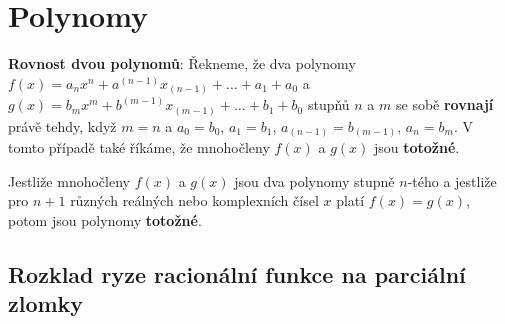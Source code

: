  \section{Polynomy}
      \begin{definition}\label{def_rov_poly}\textbf{Rovnost dvou polynomů}:
        Řekneme, že dva polynomy \(f(x)=a_nx^n+a^{(n-1)}x_{(n-1)}+\ldots+a_1+a_0\) a
        \(g(x)=b_mx^m+b^{(m-1)}x_{(m-1)}+\ldots+b_1+b_0\) stupňů \(n\) a \(m\) se sobě 
        \textbf{rovnají} právě tehdy, když \(m=n\) a \(a_0=b_0\), \(a_1=b_1\), 
        \(a_{(n-1)}=b_{(m-1)}\), \(a_n=b_m\). V tomto případě také říkáme, že mnohočleny \(f(x)\) a 
        \(g(x)\) jsou \textbf{totožné}.
      \end{definition}
      \begin{lemma}\label{la:eq_eqv_poly}
        Jestliže mnohočleny \(f(x)\) a \(g(x)\) jsou dva polynomy stupně \(n\)-tého a jestliže pro 
        \(n+1\) různých reálných nebo komplexních čísel \(x\) platí \(f(x)=g(x)\), potom jsou 
        polynomy \textbf{totožné}.
      \end{lemma}
      
    \subsection{Rozklad ryze racionální funkce na parci\-ální zlomky}

       
      
 
              